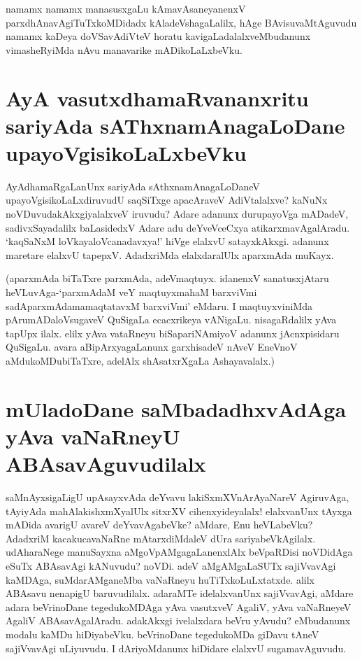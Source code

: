namamx namamx manasusxgaLu kAmavAsaneyanenxV parxdhAnavAgiTuTxkoMDidadx kAladeVshagaLalilx, hAge BAvisuvaMtAguvudu namamx kaDeya doVSavAdiVteV horatu kavigaLadalalxveMbudanunx vimasheRyiMda nAvu manavarike mADikoLaLxbeVku.

\section*{AyA vasutxdhamaRvananxritu sariyAda sAThxnamAnagaLoDane upayoVgisikoLaLxbeVku}

AyAdhamaRgaLanUnx sariyAda sAthxnamAnagaLoDaneV upayoVgisikoLaLxdiruvudU saqSiTxge apacAraveV AdiVtalalxve? kaNuNx noVDuvudakAkxgiyalalxveV iruvudu? Adare adanunx durupayoVga mADadeV, sadivxSayadalilx baLasidedxV Adare adu deYveVceCxya atikarxmavAgalAradu. `kaqSaNxM loVkayaloVcanadavxya!' hiVge elalxvU satayxkAkxgi. adanunx maretare elalxvU tapepxV. AdadxriMda elalxdaralUlx aparxmAda muKayx.

(aparxmAda biTaTxre parxmAda, adeVmaqtuyx. idanenxV sanatusxjAtaru heVLuvAga-`parxmAdaM veY maqtuyxmahaM\label{126} barxviVmi sadA\s parxmAdamamaqtatavxM barxviVmi' eMdaru. I maqtuyxviniMda pArumADaloVsugaveV QuSigaLa ecacxrikeya vANigaLu. nisagaRdalilx yAva tapUpx ilalx. elilx yAva vataRneyu biSapariNAmiyoV adanunx jAcnxpisidaru QuSigaLu. avara aBipArxyagaLanunx garxhisadeV nAveV EneVnoV aMdukoMDubiTaTxre, adelAlx shAsatxrXgaLa Ashayavalalx.)

\section*{mUladoDane saMbadadhxvAdAga yAva vaNaRneyU ABAsavAguvudilalx}

saMnAyxsigaLigU upAsayxvAda deYvavu lakiSxmXVnArAyaNareV AgiruvAga, tAyiyAda mahAlakishxmXyalUlx sitxrXV cihenxyideyalalx! elalxvanUnx tAyxga mADida avarigU avareV deYvavAgabeVke? aMdare, Enu heVLabeVku? AdadxriM kacakucavaNaRne mAtarxdiMdaleV dUra sariyabeVkAgilalx. udAharaNege manuSayxna aMgoVpAMgagaLanenxlAlx beVpaRDisi noVDidAga eSuTx ABAsavAgi kANuvudu? noVDi. adeV aMgAMgaLaSUTx sajiVvavAgi kaMDAga, suMdarAMganeMba vaNaRneyu huTiTxkoLuLxtatxde. alilx ABAsavu nenapigU baruvudilalx. adaraMTe idelalxvanUnx sajiVvavAgi, aMdare adara beVrinoDane tegedukoMDAga yAva vasutxveV AgaliV, yAva vaNaRneyeV AgaliV ABAsavAgalAradu. adakAkxgi ivelalxdara beVru yAvudu? eMbudanunx modalu kaMDu hiDiyabeVku. beVrinoDane tegedukoMDa giDavu tAneV sajiVvavAgi uLiyuvudu. I dAriyoMdanunx hiDidare elalxvU sugamavAguvudu.

